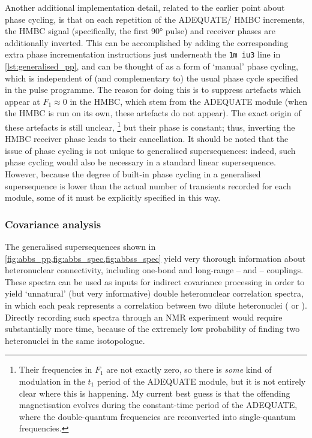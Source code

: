 Another additional implementation detail, related to the earlier point about phase cycling, is that on each repetition of the ADEQUATE/\nitrogen{} HMBC increments, the \nitrogen{} HMBC signal (specifically, the first \nitrogen{} \ang{90} pulse) and receiver phases are additionally inverted.
This can be accomplished by adding the corresponding extra phase incrementation instructions just underneath the \texttt{1m iu3} line in \cref{lst:generalised_pp}, and can be thought of as a form of `manual' phase cycling, which is independent of (and complementary to) the usual phase cycle specified in the pulse programme.
The reason for doing this is to suppress artefacts which appear at $F_1 \approx 0$ in the \nitrogen{} HMBC, which stem from the ADEQUATE module (when the \nitrogen{} HMBC is run on its own, these artefacts do not appear).
The exact origin of these artefacts is still unclear,%
\footnote{Their frequencies in $F_1$ are not exactly zero, so there is \textit{some} kind of modulation in the $t_1$ period of the ADEQUATE module, but it is not entirely clear where this is happening. My current best guess is that the offending magnetisation evolves during the constant-time period of the ADEQUATE, where the double-quantum frequencies are reconverted into single-quantum frequencies.}
but their phase is constant; thus, inverting the \nitrogen{} HMBC receiver phase leads to their cancellation.
It should be noted that the issue of phase cycling is not unique to generalised supersequences: indeed, such phase cycling would also be necessary in a standard linear  supersequence.
However, because the degree of built-in phase cycling in a generalised supersequence is lower than the actual number of transients recorded for each module, some of it must be explicitly specified in this way.


\subsubsection{Covariance analysis}

The generalised supersequences shown in \cref{fig:abbs_pp,fig:abbs_spec,fig:abbss_spec} yield very thorough information about heteronuclear connectivity, including one-bond and long-range \proton{}--\carbon{} and \proton{}--\nitrogen{} couplings.
These spectra can be used as inputs for indirect covariance processing\autocite{Zhang2004JACS,Snyder2009JPCA,Jaeger2014ARNMRS} in order to yield `unnatural' (but very informative) double heteronuclear correlation spectra, in which each peak represents a correlation between two dilute heteronuclei (\carbon{} or \nitrogen{}).
Directly recording such spectra through an NMR experiment would require substantially more time, because of the extremely low probability of finding two heteronuclei in the same isotopologue.

